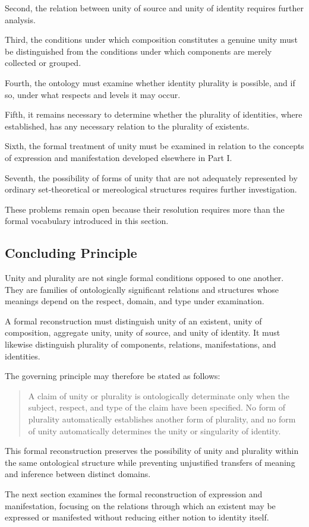 Second, the relation between
unity of source and unity of
identity requires further
analysis.

Third, the conditions under
which composition constitutes
a genuine unity must be
distinguished from the
conditions under which
components are merely
collected or grouped.

Fourth, the ontology must
examine whether identity
plurality is possible, and
if so, under what respects
and levels it may occur.

Fifth, it remains necessary
to determine whether the
plurality of identities,
where established, has any
necessary relation to the
plurality of existents.

Sixth, the formal treatment
of unity must be examined
in relation to the concepts
of expression and manifestation
developed elsewhere in Part I.

Seventh, the possibility
of forms of unity that are
not adequately represented
by ordinary set-theoretical
or mereological structures
requires further investigation.

These problems remain open
because their resolution
requires more than the
formal vocabulary introduced
in this section.

\subsection{Concluding Principle}

Unity and plurality are not
single formal conditions
opposed to one another.
They are families of
ontologically significant
relations and structures
whose meanings depend on
the respect, domain, and
type under examination.

A formal reconstruction
must distinguish unity of
an existent, unity of
composition, aggregate
unity, unity of source,
and unity of identity.
It must likewise distinguish
plurality of components,
relations, manifestations,
and identities.

The governing principle
may therefore be stated
as follows:

\begin{quote}
A claim of unity or plurality
is ontologically determinate
only when the subject,
respect, and type of the
claim have been specified.
No form of plurality
automatically establishes
another form of plurality,
and no form of unity
automatically determines
the unity or singularity
of identity.
\end{quote}

This formal reconstruction
preserves the possibility
of unity and plurality
within the same ontological
structure while preventing
unjustified transfers of
meaning and inference
between distinct domains.

The next section examines
the formal reconstruction
of expression and
manifestation, focusing
on the relations through
which an existent may
be expressed or manifested
without reducing either
notion to identity itself.

